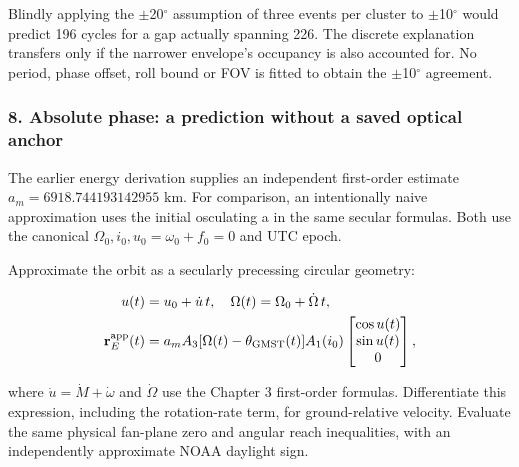 \documentclass[10pt,a4paper]{article}
\numberwithin{equation}{section}
\begin{document}
\begin{sloppypar}Blindly applying the \ensuremath{\pm}20\ensuremath{{}^{\circ}} assumption of three events per cluster to \ensuremath{\pm}10\ensuremath{{}^{\circ}} would predict 196 cycles for a gap actually spanning 226. The discrete explanation transfers only if the narrower envelope's occupancy is also accounted for. No period, phase offset, roll bound or FOV is fitted to obtain the \ensuremath{\pm}10\ensuremath{{}^{\circ}} agreement.\end{sloppypar}


\subsubsection*{8. Absolute phase: a prediction without a saved optical anchor}

\begin{sloppypar}The earlier energy derivation supplies an independent first-order estimate \(a_m=6918.744193142955\) km. For comparison, an intentionally naive approximation uses the initial osculating a in the same secular formulas. Both use the canonical \(\Omega_0,i_0,u_0=\omega_0+f_0=0\) and UTC epoch.\end{sloppypar}


\begin{sloppypar}Approximate the orbit as a secularly precessing circular geometry:\end{sloppypar}


\begin{equation}\begin{aligned}
u(t)&=u_0+\dot u\,t,\quad
\Omega(t)=\Omega_0+\dot\Omega\,t,\\
\mathbf r_E^{\rm app}(t)&=
a_m A_3[\Omega(t)-\theta_{\rm GMST}(t)]A_1(i_0)
\begin{bmatrix}\cos u(t)\\\sin u(t)\\0\end{bmatrix},
\end{aligned}\label{eq:absolute-phase}\end{equation}

\begin{sloppypar}where \(\dot u=\dot M+\dot\omega\) and \(\dot\Omega\) use the Chapter 3 first-order formulas. Differentiate this expression, including the rotation-rate term, for ground-relative velocity. Evaluate the same physical fan-plane zero and angular reach inequalities, with an independently approximate NOAA daylight sign.\end{sloppypar}
\end{document}
